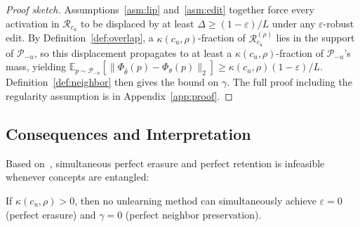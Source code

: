 \begin{proof}[Proof sketch]
Assumptions~\ref{asm:lip} and~\ref{asm:edit} together force every activation in $\mathcal{R}_{c_u}$ to be displaced by at least $\Delta \geq (1-\varepsilon)/L$ under any $\varepsilon$-robust edit. By Definition~\ref{def:overlap}, a $\kappa(c_u,\rho)$-fraction of $\mathcal{R}_{c_u}^{(\rho)}$ lies in the support of $\mathcal{P}_{-u}$, so this displacement propagates to at least a $\kappa(c_u,\rho)$-fraction of $\mathcal{P}_{-u}$'s mass, yielding $\mathbb{E}_{p\sim\mathcal{P}_{-u}}[\|\Phi_{\hat\theta}(p)-\Phi_\theta(p)\|_2] \geq \kappa(c_u,\rho)(1-\varepsilon)/L$. Definition~\ref{def:neighbor} then gives the bound on $\gamma$. The full proof including the regularity assumption is in Appendix~\ref{app:proof}.
\end{proof}

\subsection{Consequences and Interpretation}
\label{subsec:consequences}

Based on~, simultaneous perfect erasure and perfect retention is infeasible whenever concepts are entangled:
\begin{corollary}
\label{cor:impossibility}
If $\kappa(c_u,\rho) > 0$,
then no unlearning method can simultaneously achieve $\varepsilon = 0$ (perfect erasure) and $\gamma = 0$ (perfect neighbor preservation).
\end{corollary}

